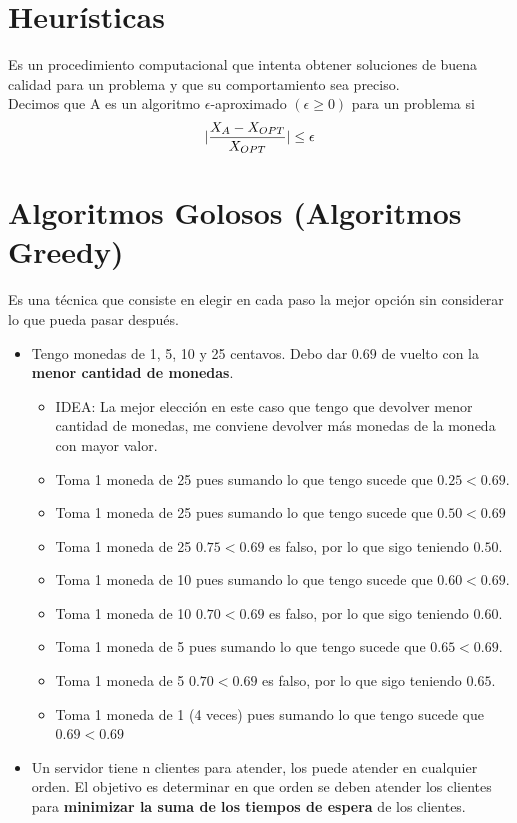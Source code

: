 \documentclass[10pt,a4paper]{article}
\begin{document}
\section*{Heurísticas}
Es un procedimiento computacional que intenta obtener soluciones de buena calidad para un problema y que su comportamiento sea preciso. \\
Decimos que A es un algoritmo $\epsilon$-aproximado $(\epsilon \ge 0)$ para un problema si \[|\frac{X_{A} - X_{OPT}}{X_{OPT}}| \le \epsilon\]
\section*{Algoritmos Golosos (Algoritmos Greedy)}
Es una técnica que consiste en elegir en cada paso la mejor opción sin considerar lo que pueda pasar después.
\begin{itemize}
    \item Tengo monedas de 1, 5, 10 y 25 centavos. Debo dar $0.69$ de vuelto con la \textbf{menor cantidad de monedas}. 
    \begin{itemize}
        \item IDEA: La mejor elección en este caso que tengo que devolver menor cantidad de monedas, me conviene devolver más monedas de la moneda con mayor valor. 
        \item Toma 1 moneda de 25 pues sumando lo que tengo sucede que $0.25<0.69$.
        \item Toma 1 moneda de 25 pues sumando lo que tengo sucede que $0.50<0.69$
        \item Toma 1 moneda de 25 $0.75<0.69$ es falso, por lo que sigo teniendo $0.50$.
        \item Toma 1 moneda de 10 pues sumando lo que tengo sucede que $0.60<0.69$.
        \item Toma 1 moneda de 10 $0.70<0.69$ es falso, por lo que sigo teniendo $0.60$.
        \item Toma 1 moneda de 5 pues sumando lo que tengo sucede que $0.65<0.69$.
        \item Toma 1 moneda de 5 $0.70<0.69$ es falso, por lo que sigo teniendo $0.65$.
        \item Toma 1 moneda de 1 (4 veces) pues sumando lo que tengo sucede que $0.69<0.69$
    \end{itemize}
    \item Un servidor tiene n clientes para atender, los puede atender en cualquier orden. El objetivo es determinar en que orden se deben atender los clientes para \textbf{minimizar la suma de los tiempos de espera} de los clientes. 

\end{itemize}
\end{document}
